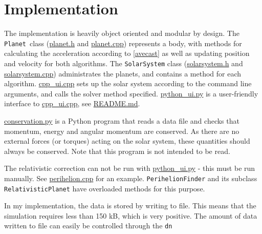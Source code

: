 \documentclass[12pt,english,a4paper]{article}
\newcommand{\program}[1]{\href{https://github.com/anjohan/Offentlig/blob/master/FYS3150/Oblig3/#1}{#1}}
\begin{document}
\section{Implementation}
The implementation is heavily object oriented and modular by design. The \texttt{Planet} class (\program{planet.h} and \program{planet.cpp}) represents a body, with methods for calculating the acceleration according to \ref{avecast} as well as updating position and velocity for both algorithms. The \texttt{SolarSystem} class (\program{solarsystem.h} and \program{solarsystem.cpp}) administrates the planets, and contains a method for each algorithm. \program{cpp\_ui.cpp} sets up the solar system according to the command line arguments, and calls the solver method specified. \program{python\_ui.py} is a user-friendly interface to \program{cpp\_ui.cpp}, see \program{README.md}.

\program{conservation.py} is a Python program that reads a data file and checks that momentum, energy and angular momentum are conserved. As there are no external forces (or torques) acting on the solar system, these quantities should always be conserved. Note that this program is not intended to be read.

The relativistic correction can not be run with \program{python\_ui.py} - this must be run manually. See \program{perihelion.cpp} for an example. \texttt{PerihelionFinder} and its subclass \texttt{RelativisticPlanet} have overloaded methods for this purpose.

In my implementation, the data is stored by writing to file. This means that the simulation requires less than 150 kB, which is very positive. The amount of data written to file can easily be controlled through the \texttt{dn}
\end{document}

